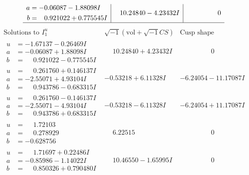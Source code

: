 \documentclass[1p]{elsarticle_modified}
\theoremstyle{definition}
\newcommand{\I}{\sqrt{-1}}
\begin{document}
$$\begin{array}{c|c|c}
\begin{aligned}
a &= -0.06087 - 1.88098 I \\
b &= \phantom{-}0.921022 + 0.775545 I\end{aligned}
 & \phantom{-}10.24840 - 4.23432 I & \phantom{-0.000000 } 0\\
 \hline 
 \end{array}$$\newpage$$\begin{array}{c|c|c}  
\text{Solutions to }I^u_{1}& \I (\text{vol} + \sqrt{-1}CS) & \text{Cusp shape}\\
 \hline 
\begin{aligned}
u &= -1.67137 - 0.26469 I \\
a &= -0.06087 + 1.88098 I \\
b &= \phantom{-}0.921022 - 0.775545 I\end{aligned}
 & \phantom{-}10.24840 + 4.23432 I & \phantom{-0.000000 } 0 \\ \hline\begin{aligned}
u &= \phantom{-}0.261760 + 0.146137 I \\
a &= -2.55071 + 4.93104 I \\
b &= \phantom{-}0.943786 - 0.683315 I\end{aligned}
 & -0.53218 + 6.11328 I & -6.24054 - 11.17087 I \\ \hline\begin{aligned}
u &= \phantom{-}0.261760 - 0.146137 I \\
a &= -2.55071 - 4.93104 I \\
b &= \phantom{-}0.943786 + 0.683315 I\end{aligned}
 & -0.53218 - 6.11328 I & -6.24054 + 11.17087 I \\ \hline\begin{aligned}
u &= \phantom{-}1.72103\phantom{ +0.000000I} \\
a &= \phantom{-}0.278929\phantom{ +0.000000I} \\
b &= -0.628756\phantom{ +0.000000I}\end{aligned}
 & \phantom{-}6.22515\phantom{ +0.000000I} & \phantom{-0.000000 } 0 \\ \hline\begin{aligned}
u &= \phantom{-}1.71697 + 0.22486 I \\
a &= -0.85986 - 1.14022 I \\
b &= \phantom{-}0.850326 + 0.790480 I\end{aligned}
 & \phantom{-}10.46550 - 1.65995 I & \phantom{-0.000000 } 0 \\ \hline\begin{aligned}

\end{aligned}
\end{array}$$
\end{document}
